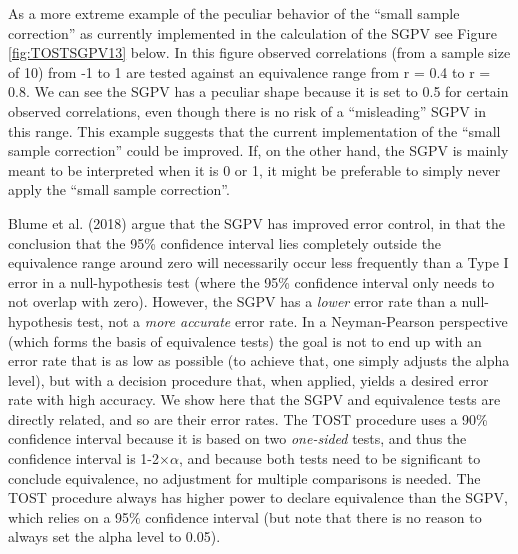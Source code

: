 \documentclass[floatsintext,man]{apa6}
\theoremstyle{definition}
\theoremstyle{definition}
\theoremstyle{definition}
\theoremstyle{remark}
\begin{document}
As a more extreme example of the peculiar behavior of the \enquote{small
sample correction} as currently implemented in the calculation of the
SGPV see Figure \ref{fig:TOSTSGPV13} below. In this figure observed
correlations (from a sample size of 10) from -1 to 1 are tested against
an equivalence range from r = 0.4 to r = 0.8. We can see the SGPV has a
peculiar shape because it is set to 0.5 for certain observed
correlations, even though there is no risk of a \enquote{misleading}
SGPV in this range. This example suggests that the current
implementation of the \enquote{small sample correction} could be
improved. If, on the other hand, the SGPV is mainly meant to be
interpreted when it is 0 or 1, it might be preferable to simply never
apply the \enquote{small sample correction}.

Blume et al. (2018) argue that the SGPV has improved error control, in
that the conclusion that the 95\% confidence interval lies completely
outside the equivalence range around zero will necessarily occur less
frequently than a Type I error in a null-hypothesis test (where the 95\%
confidence interval only needs to not overlap with zero). However, the
SGPV has a \emph{lower} error rate than a null-hypothesis test, not a
\emph{more accurate} error rate. In a Neyman-Pearson perspective (which
forms the basis of equivalence tests) the goal is not to end up with an
error rate that is as low as possible (to achieve that, one simply
adjusts the alpha level), but with a decision procedure that, when
applied, yields a desired error rate with high accuracy. We show here
that the SGPV and equivalence tests are directly related, and so are
their error rates. The TOST procedure uses a 90\% confidence interval
because it is based on two \emph{one-sided} tests, and thus the
confidence interval is 1-2\(\times\)\(\alpha\), and because both tests
need to be significant to conclude equivalence, no adjustment for
multiple comparisons is needed. The TOST procedure always has higher
power to declare equivalence than the SGPV, which relies on a 95\%
confidence interval (but note that there is no reason to always set the
alpha level to 0.05).
\end{document}
